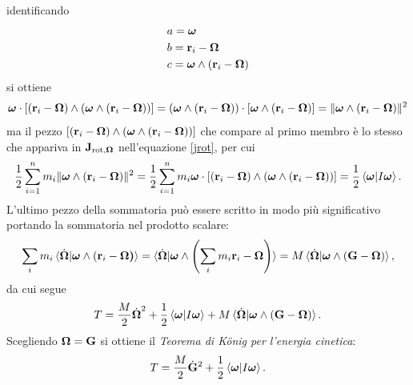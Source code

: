     identificando
    \begin{equation}
        \begin{aligned}
            &a = \boldsymbol{\omega}\\
            &b = \mathbf{r}_i-\boldsymbol{\Omega}\\
            &c = \boldsymbol{\omega} \wedge (\mathbf{r}_i-\boldsymbol{\Omega})   
        \end{aligned}
    \end{equation}
    si ottiene
    \begin{equation}
        \boldsymbol{\omega}\cdot[(\mathbf{r}_i-\boldsymbol{\Omega})\wedge(\boldsymbol{\omega} \wedge (\mathbf{r}_i-\boldsymbol{\Omega}) )] = (\boldsymbol{\omega} \wedge (\mathbf{r}_i-\boldsymbol{\Omega}) )\cdot[\boldsymbol{\omega}\wedge(\mathbf{r}_i-\boldsymbol{\Omega}) ] = \|\boldsymbol{\omega}\wedge(\mathbf{r}_i-\boldsymbol{\Omega})\|^2
    \end{equation}
    ma il pezzo $[(\mathbf{r}_i-\boldsymbol{\Omega})\wedge(\boldsymbol{\omega} \wedge (\mathbf{r}_i-\boldsymbol{\Omega}) )]$ che compare al primo membro è lo stesso che appariva in $\mathbf{J}_{\mathrm{rot},\boldsymbol{\Omega}}$ nell'equazione \eqref{jrot}, per cui
    \begin{equation}
        \frac{1}{2}\sum_{i=1}^n m_i\|\boldsymbol{\omega}\wedge(\mathbf{r}_i-\boldsymbol{\Omega})\|^2 = \frac{1}{2}\sum_{i=1}^n m_i\boldsymbol{\omega}\cdot[(\mathbf{r}_i-\boldsymbol{\Omega})\wedge(\boldsymbol{\omega} \wedge (\mathbf{r}_i-\boldsymbol{\Omega}) )] = \frac{1}{2}\braket{\boldsymbol{\omega}|I\boldsymbol{\omega}}.
    \end{equation}
    L'ultimo pezzo della sommatoria può essere scritto in modo più significativo portando la sommatoria nel prodotto scalare:
    \begin{equation}
       \sum_i m_i \braket{\dot{\boldsymbol{\Omega}}|\boldsymbol{\omega}\wedge(\mathbf{r}_i-\boldsymbol{\Omega)}} = \braket{\dot{\boldsymbol{\Omega}}|\boldsymbol{\omega}\wedge\left(\sum_i m_i \mathbf{r}_i-\boldsymbol{\Omega}\right)} = M\braket{\dot{\boldsymbol{\Omega}}|\boldsymbol{\omega}\wedge(\mathbf{G}-\boldsymbol{\Omega})},
    \end{equation}
    da cui segue
    \begin{equation}
        T = \frac{M}{2}\dot{\boldsymbol{\Omega}}^2 + \frac{1}{2}\braket{\boldsymbol{\omega}|I\boldsymbol{\omega}} + M\braket{\dot{\boldsymbol{\Omega}}|\boldsymbol{\omega}\wedge(\mathbf{G}-\boldsymbol{\Omega})}.
    \end{equation}
    Scegliendo $\boldsymbol{\Omega}=\mathbf{G}$ si ottiene il \emph{Teorema di K\"onig per l'energia cinetica}:
    \begin{equation}
        T= \frac{M}{2}\dot{\mathbf{G}}^2 + \frac{1}{2}\braket{\boldsymbol{\omega}|I\boldsymbol{\omega}}.
    \end{equation}

